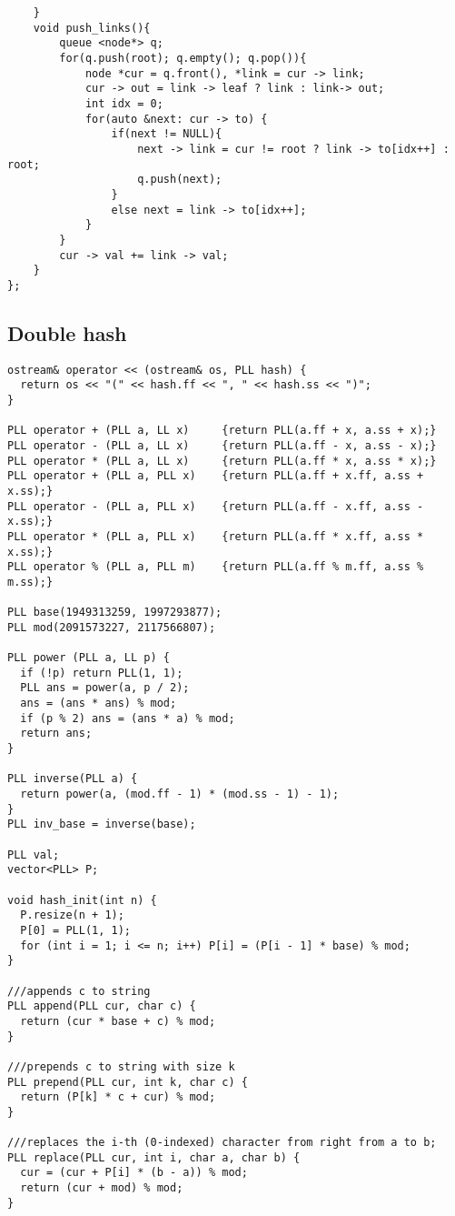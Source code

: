 \documentclass[FSZ,a4paper,onesided]{article}
\begin{document}
\begin{multicols*}{\COLS}
\begin{lstlisting}
    }
    void push_links(){
        queue <node*> q;
        for(q.push(root); q.empty(); q.pop()){
            node *cur = q.front(), *link = cur -> link;
            cur -> out = link -> leaf ? link : link-> out;
            int idx = 0;
            for(auto &next: cur -> to) {
                if(next != NULL){
                    next -> link = cur != root ? link -> to[idx++] : root;
                    q.push(next);
                } 
                else next = link -> to[idx++]; 
            }
        }
        cur -> val += link -> val;
    }
};
\end{lstlisting}
\subsection{Double hash}
\begin{lstlisting}
ostream& operator << (ostream& os, PLL hash) {
  return os << "(" << hash.ff << ", " << hash.ss << ")";
}

PLL operator + (PLL a, LL x)     {return PLL(a.ff + x, a.ss + x);}
PLL operator - (PLL a, LL x)     {return PLL(a.ff - x, a.ss - x);}
PLL operator * (PLL a, LL x)     {return PLL(a.ff * x, a.ss * x);}
PLL operator + (PLL a, PLL x)    {return PLL(a.ff + x.ff, a.ss + x.ss);}
PLL operator - (PLL a, PLL x)    {return PLL(a.ff - x.ff, a.ss - x.ss);}
PLL operator * (PLL a, PLL x)    {return PLL(a.ff * x.ff, a.ss * x.ss);}
PLL operator % (PLL a, PLL m)    {return PLL(a.ff % m.ff, a.ss % m.ss);}

PLL base(1949313259, 1997293877);
PLL mod(2091573227, 2117566807);

PLL power (PLL a, LL p) {
  if (!p) return PLL(1, 1);
  PLL ans = power(a, p / 2);
  ans = (ans * ans) % mod;
  if (p % 2) ans = (ans * a) % mod;
  return ans;
}

PLL inverse(PLL a) {
  return power(a, (mod.ff - 1) * (mod.ss - 1) - 1);
}
PLL inv_base = inverse(base);

PLL val;
vector<PLL> P;

void hash_init(int n) {
  P.resize(n + 1);
  P[0] = PLL(1, 1);
  for (int i = 1; i <= n; i++) P[i] = (P[i - 1] * base) % mod;
}

///appends c to string
PLL append(PLL cur, char c) {
  return (cur * base + c) % mod;
}

///prepends c to string with size k
PLL prepend(PLL cur, int k, char c) {
  return (P[k] * c + cur) % mod;
}

///replaces the i-th (0-indexed) character from right from a to b;
PLL replace(PLL cur, int i, char a, char b) {
  cur = (cur + P[i] * (b - a)) % mod;
  return (cur + mod) % mod;
}


\end{lstlisting}
\end{multicols*}
\end{document}
